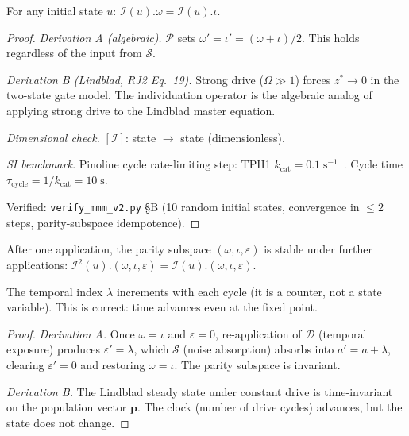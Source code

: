 \begin{theorem}
\label{thm:ind_parity}
For any initial state $u$:
$\mathcal{I}(u).\omega = \mathcal{I}(u).\iota$.

\begin{proof}
\emph{Derivation A (algebraic).}
$\mathcal{P}$ sets $\omega' = \iota' = (\omega+\iota)/2$.
This holds regardless of the input from $\mathcal{S}$.

\emph{Derivation B (Lindblad, RJ2 Eq.~19).}
Strong drive ($\Omega \gg 1$) forces $z^* \to 0$ in the two-state
gate model. The individuation operator is the algebraic analog of
applying strong drive to the Lindblad master equation.

\emph{Dimensional check.}
$[\mathcal{I}]$: state $\to$ state (dimensionless). \checkmark

\emph{SI benchmark.}
Pinoline cycle rate-limiting step: TPH1 $k_\mathrm{cat} = 0.1\;\mathrm{s^{-1}}$~\cite{mckinney05}.
Cycle time $\tau_\mathrm{cycle} = 1/k_\mathrm{cat} = 10\;\mathrm{s}$.

Verified: \texttt{verify\_mmm\_v2.py} \S B (10 random initial states,
convergence in $\leq 2$ steps, parity-subspace idempotence).
\qedhere
\end{proof}
\end{theorem}

\begin{theorem}
\label{thm:idempotent}
After one application, the parity subspace $(\omega, \iota, \varepsilon)$
is stable under further applications:
$\mathcal{I}^2(u).(\omega,\iota,\varepsilon) = \mathcal{I}(u).(\omega,\iota,\varepsilon)$.

The temporal index $\lambda$ increments with each cycle (it is a counter,
not a state variable). This is correct: time advances even at the fixed point.

\begin{proof}
\emph{Derivation A.} Once $\omega = \iota$ and $\varepsilon = 0$,
re-application of $\mathcal{D}$ (temporal exposure) produces
$\varepsilon' = \lambda$, which $\mathcal{S}$ (noise absorption)
absorbs into $a' = a + \lambda$, clearing $\varepsilon' = 0$ and
restoring $\omega = \iota$. The parity subspace is invariant.

\emph{Derivation B.}
The Lindblad steady state under constant drive is time-invariant
on the population vector $\mathbf{p}$. The clock (number of drive
cycles) advances, but the state does not change.
\qedhere
\end{proof}
\end{theorem}

